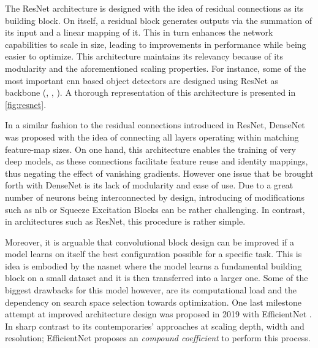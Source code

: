

%
\noindent The ResNet architecture is designed with the idea of residual connections as its 
building block. On itself, a residual block generates outputs via the summation of its input and a 
linear mapping of it. This in turn enhances the network capabilities to scale in size, leading to 
improvements in performance while being easier to optimize. This architecture maintains its 
relevancy because of its modularity and the aforementioned scaling properties. For instance, some 
of the most important \gls{cnn} based object detectors are designed using ResNet as backbone 
(\cite{ren2015faster}, \cite{lin2017focal}, \cite{he2017mask}). A thorough representation of this 
architecture is presented in \autoref{fig:resnet}. 

In a similar fashion to the residual connections introduced in ResNet, DenseNet 
\autocite{huang2017densely} was proposed with the idea of connecting all layers operating within 
matching feature-map sizes. On one hand, this architecture enables the training of very deep 
models, as these connections facilitate feature reuse and identity mappings, thus negating the 
effect of vanishing gradients. However one issue that be brought forth with DenseNet is its 
lack of  modularity and ease of use. Due to a great number of neurons being interconnected by 
design, introducing of modifications such as \gls{nlb}\autocite{wang2018non} or Squeeze Excitation 
Blocks  \autocite{hu2018squeeze} can be  rather challenging. In contrast, in architectures such as 
ResNet, this procedure is rather simple.

Moreover, it is arguable that convolutional block design can be improved if a model learns on 
itself the best configuration possible for a specific task. This is idea is embodied by the 
\gls{nasnet} \autocite{zoph2018learning} where the model learns a fundamental building block on a 
small dataset and it is then transferred into a larger one. Some of the biggest drawbacks for this 
model however, are its computational load and the dependency on search space selection towards 
optimization. One last milestone attempt at improved architecture design was proposed in 2019 with 
EfficientNet \autocite{tan2019efficientnet}. In sharp contrast to its contemporaries' approaches at 
scaling depth, width and resolution; EfficientNet proposes an \emph{compound coefficient} to 
perform this process.

